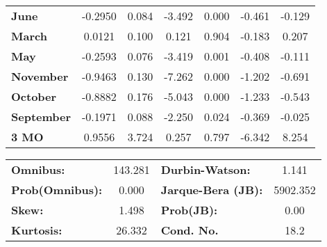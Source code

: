 \begin{center}
\begin{tabular}{lcccccc}
\textbf{June}      &      -0.2950  &        0.084     &    -3.492  &         0.000        &       -0.461    &       -0.129     \\
\textbf{March}     &       0.0121  &        0.100     &     0.121  &         0.904        &       -0.183    &        0.207     \\
\textbf{May}       &      -0.2593  &        0.076     &    -3.419  &         0.001        &       -0.408    &       -0.111     \\
\textbf{November}  &      -0.9463  &        0.130     &    -7.262  &         0.000        &       -1.202    &       -0.691     \\
\textbf{October}   &      -0.8882  &        0.176     &    -5.043  &         0.000        &       -1.233    &       -0.543     \\
\textbf{September} &      -0.1971  &        0.088     &    -2.250  &         0.024        &       -0.369    &       -0.025     \\
\textbf{3 MO}      &       0.9556  &        3.724     &     0.257  &         0.797        &       -6.342    &        8.254     \\
\bottomrule
\end{tabular}
\begin{tabular}{lclc}
\textbf{Omnibus:}       & 143.281 & \textbf{  Durbin-Watson:     } &    1.141  \\
\textbf{Prob(Omnibus):} &   0.000 & \textbf{  Jarque-Bera (JB):  } & 5902.352  \\
\textbf{Skew:}          &   1.498 & \textbf{  Prob(JB):          } &     0.00  \\
\textbf{Kurtosis:}      &  26.332 & \textbf{  Cond. No.          } &     18.2  \\
\bottomrule
\end{tabular}
\end{center}

